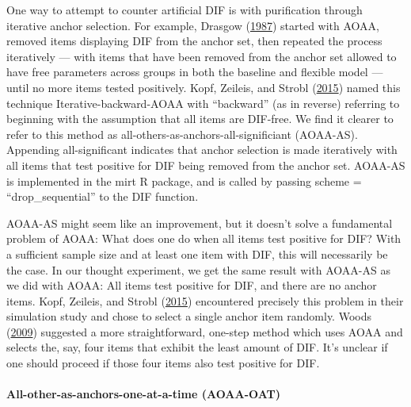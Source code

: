 \documentclass[
  11pt,
]{article}
\begin{document}
One way to attempt to counter artificial DIF is with purification through iterative anchor selection. For example, Drasgow (\protect\hyperlink{ref-drasgow1987study}{1987}) started with AOAA, removed items displaying DIF from the anchor set, then repeated the process iteratively --- with items that have been removed from the anchor set allowed to have free parameters across groups in both the baseline and flexible model --- until no more items tested positively. Kopf, Zeileis, and Strobl (\protect\hyperlink{ref-kopf2015framework}{2015}) named this technique Iterative-backward-AOAA with \enquote{backward} (as in reverse) referring to beginning with the assumption that all items are DIF-free. We find it clearer to refer to this method as all-others-as-anchors-all-significiant (AOAA-AS). Appending all-significant indicates that anchor selection is made iteratively with all items that test positive for DIF being removed from the anchor set. AOAA-AS is implemented in the mirt R package, and is called by passing scheme = \enquote{drop\_sequential} to the DIF function.

AOAA-AS might seem like an improvement, but it doesn't solve a fundamental problem of AOAA: What does one do when all items test positive for DIF? With a sufficient sample size and at least one item with DIF, this will necessarily be the case. In our thought experiment, we get the same result with AOAA-AS as we did with AOAA: All items test positive for DIF, and there are no anchor items. Kopf, Zeileis, and Strobl (\protect\hyperlink{ref-kopf2015framework}{2015}) encountered precisely this problem in their simulation study and chose to select a single anchor item randomly. Woods (\protect\hyperlink{ref-woods2009empirical}{2009}) suggested a more straightforward, one-step method which uses AOAA and selects the, say, four items that exhibit the least amount of DIF. It's unclear if one should proceed if those four items also test positive for DIF.

\hypertarget{all-other-as-anchors-one-at-a-time-aoaa-oat}{%
\paragraph{All-other-as-anchors-one-at-a-time (AOAA-OAT)}\label{all-other-as-anchors-one-at-a-time-aoaa-oat}}
\end{document}
